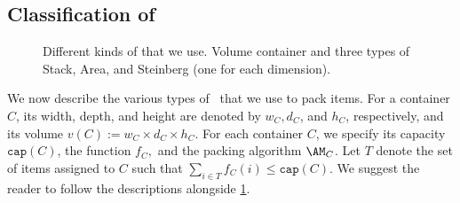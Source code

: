 \subsection{Classification of \boxes}
\label{sec:cont-class}

\begin{figure}
    \centering
    
    \caption{Different kinds of \boxes that we use.  Volume container and three types of Stack, Area, and Steinberg \boxes (one for each dimension).}
    \label{fig:large-stack-containers}
\end{figure}

We now describe the various types of \boxes\ that we use to pack items. For a container $C$, its width, depth, and height are denoted by $w_C, d_C$, and $h_C$, respectively, and its volume $v(C) := w_C \times d_C \times h_C$.
For each container $C$, we specify its capacity $\mathtt{cap}(C)$, the function $f_C,$ and the packing algorithm $\AM_C$.
Let $T$ denote the set of items assigned to $C$ such that $\sum_{i\in T}f_C(i)\le \mathtt{cap}(C)$.
We suggest the reader to follow the descriptions alongside \cref{fig:large-stack-containers}.
